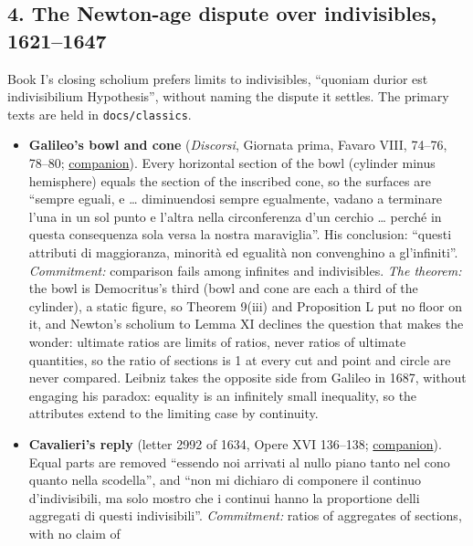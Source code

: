 \documentclass[11pt,a4paper]{article}
\newcommand{\tightlist}{\setlength{\itemsep}{0pt}\setlength{\parskip}{0pt}}
\begin{document}
\hypertarget{the-newton-age-dispute-over-indivisibles-16211647}{%
\subsection{4. The Newton-age dispute over indivisibles,
1621--1647}\label{the-newton-age-dispute-over-indivisibles-16211647}}

Book I's closing scholium prefers limits to indivisibles, ``quoniam
durior est indivisibilium Hypothesis'', without naming the dispute it
settles. The primary texts are held in \texttt{docs/classics}.

\begin{itemize}
\tightlist
\item
  \textbf{Galileo's bowl and cone} (\emph{Discorsi}, Giornata prima,
  Favaro VIII, 74--76, 78--80;
  \href{../docs/classics/Galileo_Discorsi_GiornataPrima_Favaro_it_wikisource.md}{companion}).
  Every horizontal section of the bowl (cylinder minus hemisphere)
  equals the section of the inscribed cone, so the surfaces are ``sempre
  eguali, e \ldots{} diminuendosi sempre egualmente, vadano a terminare
  l'una in un sol punto e l'altra nella circonferenza d'un cerchio
  \ldots{} perché in questa consequenza sola versa la nostra
  maraviglia''. His conclusion: ``questi attributi di maggioranza,
  minorità ed egualità non convenghino a gl'infiniti''.
  \emph{Commitment:} comparison fails among infinites and indivisibles.
  \emph{The theorem:} the bowl is Democritus's third (bowl and cone are
  each a third of the cylinder), a static figure, so Theorem 9(iii) and
  Proposition L put no floor on it, and Newton's scholium to Lemma XI
  declines the question that makes the wonder: ultimate ratios are
  limits of ratios, never ratios of ultimate quantities, so the ratio of
  sections is 1 at every cut and point and circle are never compared.
  Leibniz takes the opposite side from Galileo in 1687, without engaging
  his paradox: equality is an infinitely small inequality, so the
  attributes extend to the limiting case by continuity.
\item
  \textbf{Cavalieri's reply} (letter 2992 of 1634, Opere XVI 136--138;
  \href{../docs/classics/Galileo_Opere_XVI_indivisibles_letters_1634-1636_OCR.md}{companion}).
  Equal parts are removed ``essendo noi arrivati al nullo piano tanto
  nel cono quanto nella scodella'', and ``non mi dichiaro di componere
  il continuo d'indivisibili, ma solo mostro che i continui hanno la
  proportione delli aggregati di questi indivisibili''.
  \emph{Commitment:} ratios of aggregates of sections, with no claim of

\end{itemize}
\end{document}
